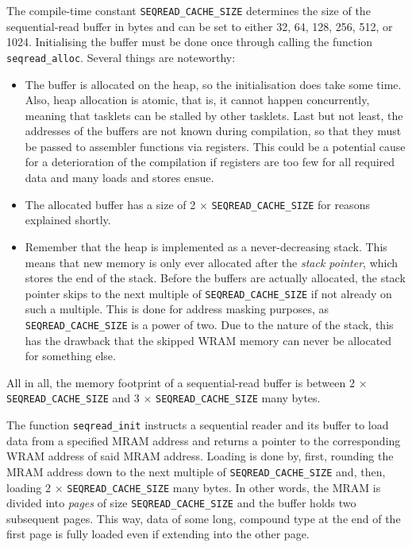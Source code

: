 The compile-time constant \lstinline|SEQREAD_CACHE_SIZE| determines the size of the sequential-read buffer in bytes and can be set to either 32, 64, 128, 256, 512, or 1024.
Initialising the buffer must be done once through calling the function \lstinline|seqread_alloc|.
Several things are noteworthy:
\begin{itemize}
	\item
	The buffer is allocated on the heap, so the initialisation does take some time.
	Also, heap allocation is atomic, that is, it cannot happen concurrently, meaning that tasklets can be stalled by other tasklets.
	Last but not least, the addresses of the buffers are not known during compilation, so that they must be passed to assembler functions via registers.
	This could be a potential cause for a deterioration of the compilation if registers are too few for all required data and many loads and stores ensue.

	\item
	The allocated buffer has a size of 2 × \lstinline|SEQREAD_CACHE_SIZE| for reasons explained shortly.

	\item
	Remember that the heap is implemented as a never-decreasing stack.
	This means that new memory is only ever allocated after the \emph{stack pointer}, which stores the end of the stack.
	Before the buffers are actually allocated, the stack pointer skips to the next multiple of \lstinline|SEQREAD_CACHE_SIZE| if not already on such a multiple.
	This is done for address masking purposes, as \lstinline|SEQREAD_CACHE_SIZE| is a power of two.
	Due to the nature of the stack, this has the drawback that the skipped WRAM memory can never be allocated for something else.
\end{itemize}
All in all, the memory footprint of a sequential-read buffer is between 2 × \lstinline|SEQREAD_CACHE_SIZE| and 3 × \lstinline|SEQREAD_CACHE_SIZE| many bytes.

The function \lstinline|seqread_init| instructs a sequential reader and its buffer to load data from a specified MRAM address and returns a pointer to the corresponding WRAM address of said MRAM address.
Loading is done by, first, rounding the MRAM address down to the next multiple of \lstinline|SEQREAD_CACHE_SIZE| and, then, loading 2 × \lstinline|SEQREAD_CACHE_SIZE| many bytes.
In other words, the MRAM is divided into \emph{pages} of size \lstinline|SEQREAD_CACHE_SIZE| and the buffer holds two subsequent pages.
This way, data of some long, compound type at the end of the first page is fully loaded even if extending into the other page.

